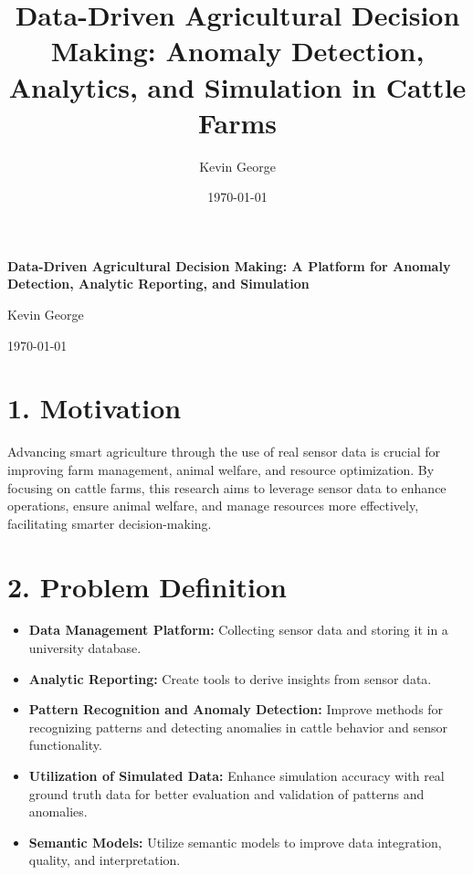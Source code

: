 \documentclass[11pt]{article}
\title{Data-Driven Agricultural Decision Making: Anomaly Detection, Analytics, and Simulation in Cattle Farms}
\author{Kevin George}
\date{\today}
\begin{document}
\begin{titlepage}
    \centering
    \vspace*{0.3in}
    \LARGE\textbf{Data-Driven Agricultural Decision Making: A Platform for Anomaly Detection, Analytic Reporting, and Simulation}\par
    \vspace{0.5in}
    \large Kevin George\par
    \vspace{0.2in}
    \normalsize \today
    \thispagestyle{empty}
\end{titlepage}

\section*{1. Motivation}
Advancing smart agriculture through the use of real sensor data is crucial for improving farm management, animal welfare, and resource optimization. By focusing on cattle farms, this research aims to leverage sensor data to enhance operations, ensure animal welfare, and manage resources more effectively, facilitating smarter decision-making.

\section*{2. Problem Definition}
\begin{itemize}
    \item \textbf{Data Management Platform:} Collecting sensor data and storing it in a university database.
    \item \textbf{Analytic Reporting:} Create tools to derive insights from sensor data.
    \item \textbf{Pattern Recognition and Anomaly Detection:} Improve methods for recognizing patterns and detecting anomalies in cattle behavior and sensor functionality.
    \item \textbf{Utilization of Simulated Data:} Enhance simulation accuracy with real ground truth data for better evaluation and validation of patterns and anomalies.
    \item \textbf{Semantic Models:} Utilize semantic models to improve data integration, quality, and interpretation.
\end{itemize}
\end{document}
